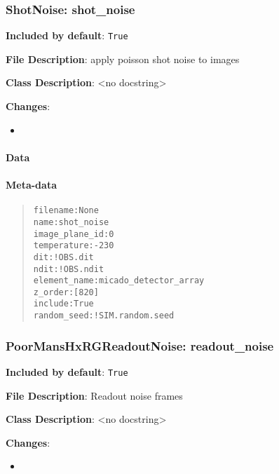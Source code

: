 \documentclass[a4paper]{article}
\begin{document}
\subsubsection{ShotNoise: \textquotedbl{}shot\_noise\textquotedbl{}%
  \label{shotnoise-shot-noise}%
}

\textbf{Included by default}: \texttt{True}

\textbf{File Description}: apply poisson shot noise to images

\textbf{Class Description}: <no docstring>

\textbf{Changes}:

\begin{itemize}
\item \end{itemize}


\paragraph{Data%
  \label{id35}%
}


\paragraph{Meta-data%
  \label{id36}%
}

\begin{quote}
\begin{alltt}
      filename : None
          name : shot_noise
image_plane_id : 0
   temperature : -230
           dit : !OBS.dit
          ndit : !OBS.ndit
  element_name : micado_detector_array
       z_order : [820]
       include : True
   random_seed : !SIM.random.seed
\end{alltt}
\end{quote}


\subsubsection{PoorMansHxRGReadoutNoise: \textquotedbl{}readout\_noise\textquotedbl{}%
  \label{poormanshxrgreadoutnoise-readout-noise}%
}

\textbf{Included by default}: \texttt{True}

\textbf{File Description}: Readout noise frames

\textbf{Class Description}: <no docstring>

\textbf{Changes}:

\begin{itemize}
\item \end{itemize}
\end{document}
